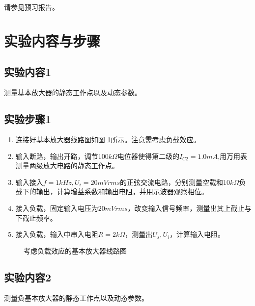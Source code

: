 \documentclass[a4paper,11pt,UTF8]{ctexart}
\begin{document}
请参见预习报告。

\section{实验内容与步骤}
\subsection{实验内容1}
	测量基本放大器的静态工作点以及动态参数。
\subsection{实验步骤1}
	\begin{enumerate}
    \item 连接好基本放大器线路图如图 \ref{fig:basicCircuit}所示。注意需考虑负载效应。
    \item 输入断路，输出开路，调节$100k\Omega$电位器使得第二级的$I_{C2}=1.0mA$,用万用表测量两级放大电路的静态工作点。
    \item 输入接入$f=1kHz,U_i=20mVrms$的正弦交流电路，分别测量空载和$10k\Omega$负载下的输出，计算增益系数和输出电阻，并用示波器观察相位。
    \item 接入负载，固定输入电压为$20mVrms$，改变输入信号频率，测量出其上截止与下截止频率。
    \item 接入负载，输入中串入电阻$R=2k\Omega$，测量出$U_s,U_i$，计算输入电阻。
  \end{enumerate}
  \begin{figure}[htbp]
    \centering
    \caption{考虑负载效应的基本放大器线路图}
    \label{fig:basicCircuit}
    \end{figure}

    \subsection{实验内容2}
    测量负基本放大器的静态工作点以及动态参数。
\end{document}
